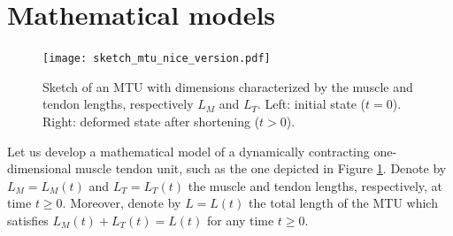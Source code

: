 \documentclass{sfuthesis}
\numberwithin{equation}{section}
\numberwithin{figure}{chapter}
\numberwithin{table}{chapter}
\theoremstyle{definition}
\begin{document}


\section{Mathematical models}

\begin{figure}
    \centering
    \texttt{[image: sketch\_mtu\_nice\_version.pdf]}
    \caption{Sketch of an MTU with dimensions characterized by the muscle and tendon lengths, respectively $L_M$ and $L_T$. Left: initial state ($t=0$). Right: deformed state after shortening ($t>0$).}
    \label{fig:mtu_sketch}
\end{figure}

Let us develop a mathematical model of a dynamically contracting one-dimensional muscle tendon unit, such as the one depicted in Figure \ref{fig:mtu_sketch}. Denote by $L_M = L_M(t)$ and $L_T= L_T(t)$ the muscle and tendon lengths, respectively, at time $t \geq 0$. Moreover, denote by $L = L(t)$ the total length of the MTU which satisfies $L_M(t) + L_T(t) = L(t)$ for any time $t \geq 0$.
\end{document}
